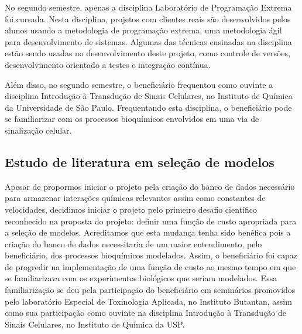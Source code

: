 \documentclass[12pt]{article}
\begin{document}
No segundo semestre, apenas a disciplina Laboratório de Programação 
Extrema foi cursada. Nesta disciplina, projetos com clientes reais são
desenvolvidos pelos alunos usando a metodologia de programação extrema, 
uma metodologia ágil para desenvolvimento de sistemas. Algumas das 
técnicas ensinadas na disciplina estão sendo usadas no desenvolvimento
deste projeto, como controle de versões, desenvolvimento orientado a 
testes e integração contínua. 

Além disso, no segundo semestre, o beneficiário frequentou como ouvinte
a disciplina Introdução à Transdução de Sinais Celulares, no Instituto 
de Química da Universidade de São Paulo. Frequentando esta disciplina,
o beneficiário pode se familiarizar com os processos bioquímicos 
envolvidos em uma via de sinalização celular.

\subsection{Estudo de literatura em seleção de modelos}


Apesar de propormos iniciar o projeto pela criação do banco de dados
necessário para armazenar interações químicas relevantes assim como 
constantes de velocidades, decidimos iniciar o projeto pelo primeiro
desafio científico reconhecido na proposta do projeto: definir uma 
função de custo apropriada para a seleção de modelos. Acreditamos que 
esta mudança tenha sido benéfica pois a criação do banco de dados 
necessitaria de um maior entendimento, pelo beneficiário, dos processos
bioquímicos modelados. Assim, o beneficiário foi capaz de progredir
na implementação de uma função de custo ao mesmo tempo em que se 
familiarizava com os experimentos biológicos que seriam modelados. 
Essa familiarização se deu pela participação do beneficiário em 
seminários promovidos pelo laboratório Especial de Toxinologia Aplicada,
no Instituto Butantan, assim como sua participação como ouvinte na 
disciplina Introdução à Transdução de Sinais Celulares, no Instituto de
Química da USP.
\end{document}
